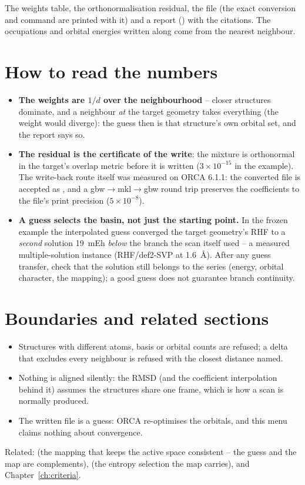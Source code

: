 The weights table, the orthonormalisation residual, the  file
(the exact conversion and  command are printed with it) and a
report () with the citations.  The occupations
and orbital energies written along come from the nearest neighbour.

\section{How to read the numbers}

\begin{readbox}
\begin{itemize}
  \item \textbf{The weights are $1/d$ over the neighbourhood} -- closer
    structures dominate, and a neighbour \emph{at} the target geometry takes
    everything (the weight would diverge): the guess then is that structure's
    own orbital set, and the report says so.
  \item \textbf{The residual is the certificate of the write}: the mixture is
    orthonormal in the target's overlap metric before it is written
    ($3\times10^{-15}$ in the example).  The write-back route itself was
    measured on ORCA 6.1.1: the converted file is accepted as
    , and a gbw$\to$mkl$\to$gbw round trip
    preserves the coefficients to the file's print precision ($5\times10^{-8}$).
  \item \textbf{A guess selects the basin, not just the starting point.}  In
    the frozen example the interpolated guess converged the target geometry's
    RHF to a \emph{second} solution 19~mEh \emph{below} the branch the scan
    itself used -- a measured multiple-solution instance (RHF/def2-SVP at
    1.6~\AA).  After any guess transfer, check that the solution still belongs
    to the series (energy, orbital character, the mapping); a good guess does
    not guarantee branch continuity.
\end{itemize}
\end{readbox}

\section{Boundaries and related sections}

\begin{refusalbox}
\begin{itemize}
  \item Structures with different atoms, basis or orbital counts are refused;
    a delta that excludes every neighbour is refused with the closest
    distance named.
  \item Nothing is aligned silently: the RMSD (and the coefficient
    interpolation behind it) assumes the structures share one frame, which is
    how a scan is normally produced.
  \item The written file is a guess: ORCA re-optimises the orbitals, and this
    menu claims nothing about convergence.
\end{itemize}
\end{refusalbox}

Related:  (the mapping that keeps the active space consistent -- the
guess and the map are complements),  (the entropy selection the map
carries), and Chapter~\ref{ch:criteria}.
